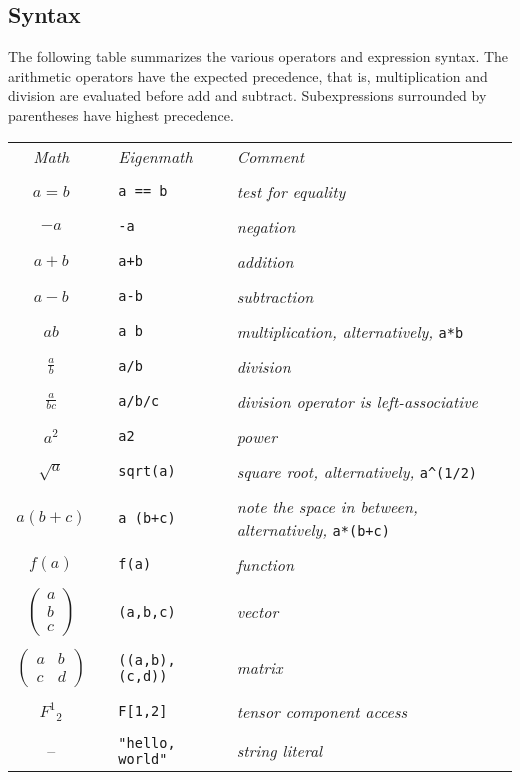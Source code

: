 \subsection{Syntax}
The following table summarizes the various operators and expression syntax.
The arithmetic operators have the expected precedence, that is,
multiplication and division are evaluated before add and subtract.
Subexpressions surrounded by parentheses have highest precedence.

\begin{center}
\begin{tabular}{clll}
{\it Math} & & {\it Eigenmath} & {\it Comment} \\
\\
$a=b$ & & \verb$a == b$ & {\it test for equality} \\
\\
$-a$ & & {\tt -a} & {\it negation} \\
\\
$a+b$ & & {\tt a+b} & {\it addition} \\
\\
$a-b$ & & {\tt a-b} & {\it subtraction} \\
\\
$ab$ & & {\tt a b} & {\it multiplication, alternatively,} \verb$a*b$ \\
\\
$\displaystyle\frac{a}{b}$ & & {\tt a/b} & {\it division}\\
\\
$\displaystyle\frac{a}{bc}$ & & {\tt a/b/c} & {\it division operator is left-associative} \\
\\
$a^2$ & & {\tt a{\char94}2} & {\it power}\\
\\
$\sqrt{a}$ & & \verb$sqrt(a)$ & {\it square root, alternatively,} \verb$a^(1/2)$ \\
\\
$a(b+c)$ & & {\tt a (b+c)} & {\it note the space in between, alternatively,} \verb$a*(b+c)$ \\
\\
$f(a)$ & & {\tt f(a)} & {\it function} \\
\\
$\begin{pmatrix}a\\ b\\ c\end{pmatrix}$ & & {\tt (a,b,c)} & {\it vector} \\
\\
$\begin{pmatrix}a&b\\ c&d\end{pmatrix}$ & & {\tt ((a,b),(c,d))} & {\it matrix} \\
\\
$F^1{}_2$ & & {\tt F[1,2]} & {\it tensor component access} \\
\\
-- & & \verb$"hello, world"$ & {\it string literal} \\
\end{tabular}
\end{center}
